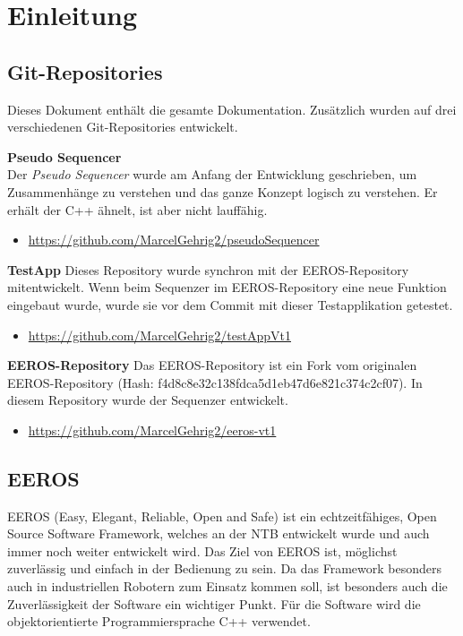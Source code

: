 \chapter{Einleitung}


\section{Git-Repositories}
Dieses Dokument enthält die gesamte Dokumentation.
Zusätzlich wurden auf drei verschiedenen Git-Repositories entwickelt.

\textbf{Pseudo Sequencer}\\
Der \textit{Pseudo Sequencer} wurde am Anfang der Entwicklung geschrieben, um Zusammenhänge zu verstehen und das ganze Konzept logisch zu verstehen.
Er erhält der C++ ähnelt, ist aber nicht lauffähig.
\begin{itemize}
\item \url{https://github.com/MarcelGehrig2/pseudoSequencer}
\end{itemize}

\textbf{TestApp}
Dieses Repository wurde synchron mit der EEROS-Repository mitentwickelt.
Wenn beim Sequenzer im EEROS-Repository eine neue Funktion eingebaut wurde, wurde sie vor dem Commit mit dieser Testapplikation getestet.
\begin{itemize}
\item \url{https://github.com/MarcelGehrig2/testAppVt1}
\end{itemize}

\textbf{EEROS-Repository}
Das EEROS-Repository ist ein Fork vom originalen EEROS-Repository (Hash: f4d8c8e32c138fdca5d1eb47d6e821c374c2cf07).
In diesem Repository wurde der Sequenzer entwickelt.
\begin{itemize}
\item \url{https://github.com/MarcelGehrig2/eeros-vt1}
\end{itemize}



\section{EEROS}
EEROS (Easy, Elegant, Reliable, Open and Safe) ist ein echtzeitfähiges, Open Source Software Framework, welches an der NTB entwickelt wurde und auch immer noch weiter entwickelt wird. 
Das Ziel von EEROS ist, möglichst zuverlässig und einfach in der Bedienung zu sein.
Da das Framework besonders auch in industriellen Robotern zum Einsatz kommen soll, ist besonders auch die Zuverlässigkeit der Software ein wichtiger Punkt.
Für die Software wird die objektorientierte Programmiersprache C++ verwendet. %


